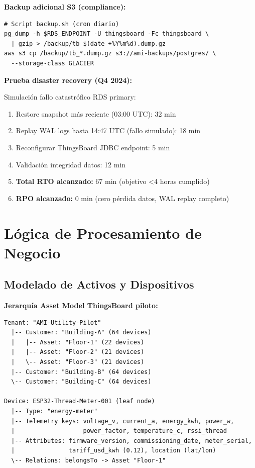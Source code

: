 \textbf{Backup adicional S3 (compliance):}

\begin{verbatim}
# Script backup.sh (cron diario)
pg_dump -h $RDS_ENDPOINT -U thingsboard -Fc thingsboard \
  | gzip > /backup/tb_$(date +%Y%m%d).dump.gz
aws s3 cp /backup/tb_*.dump.gz s3://ami-backups/postgres/ \
  --storage-class GLACIER
\end{verbatim}

\textbf{Prueba disaster recovery (Q4 2024):}

Simulación fallo catastrófico RDS primary:
\begin{enumerate}
    \item Restore snapshot más reciente (03:00 UTC): 32 min
    \item Replay WAL logs hasta 14:47 UTC (fallo simulado): 18 min
    \item Reconfigurar ThingsBoard JDBC endpoint: 5 min
    \item Validación integridad datos: 12 min
    \item \textbf{Total RTO alcanzado:} 67 min (objetivo <4 horas cumplido)
    \item \textbf{RPO alcanzado:} 0 min (cero pérdida datos, WAL replay completo)
\end{enumerate}

\section{Lógica de Procesamiento de Negocio}
\label{sec:server-logica}

\subsection{Modelado de Activos y Dispositivos}
\label{sec:server-assets}

\textbf{Jerarquía Asset Model ThingsBoard piloto:}

\begin{verbatim}
Tenant: "AMI-Utility-Pilot"
  |-- Customer: "Building-A" (64 devices)
  |   |-- Asset: "Floor-1" (22 devices)
  |   |-- Asset: "Floor-2" (21 devices)
  |   \-- Asset: "Floor-3" (21 devices)
  |-- Customer: "Building-B" (64 devices)
  \-- Customer: "Building-C" (64 devices)

Device: ESP32-Thread-Meter-001 (leaf node)
  |-- Type: "energy-meter"
  |-- Telemetry keys: voltage_v, current_a, energy_kwh, power_w, 
  |                   power_factor, temperature_c, rssi_thread
  |-- Attributes: firmware_version, commissioning_date, meter_serial,
  |               tariff_usd_kwh (0.12), location (lat/lon)
  \-- Relations: belongsTo -> Asset "Floor-1"
\end{verbatim}

